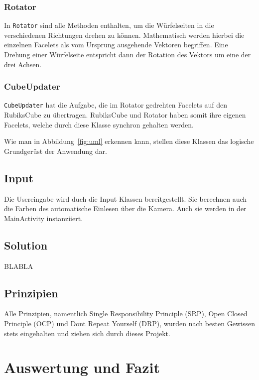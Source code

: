 \subsubsection{Rotator}

In \texttt{Rotator} sind alle Methoden enthalten, um die Würfelseiten in die
verschiedenen Richtungen drehen zu können. Mathematisch werden hierbei die
einzelnen Facelets als vom Ursprung ausgehende Vektoren begriffen. Eine Drehung
einer Würfelseite entspricht dann der Rotation des Vektors um eine der drei
Achsen.


\subsubsection{CubeUpdater}

\texttt{CubeUpdater} hat die Aufgabe, die im Rotator gedrehten Facelets auf den
RubiksCube zu übertragen. RubiksCube und Rotator haben somit ihre eigenen
Facelets, welche durch diese Klasse synchron gehalten werden.


Wie man in Abbildung~\ref{fig:uml} erkennen kann, stellen diese Klassen das
logische Grundgerüst der Anwendung dar. 



\subsection{Input}

Die Usereingabe wird duch die Input Klassen bereitgestellt. Sie berechnen auch
die Farben des automatische Einlesen über die Kamera. Auch sie werden in der
MainActivity instanziiert.

\subsection{Solution}

BLABLA




\subsection{Prinzipien}  %
Alle Prinzipien, namentlich Single Responsibility Principle (SRP), Open Closed
Principle (OCP) und Dont Repeat Yourself (DRP), wurden nach besten Gewissen stets
eingehalten und ziehen sich durch dieses Projekt.

\section{Auswertung und Fazit}  %

